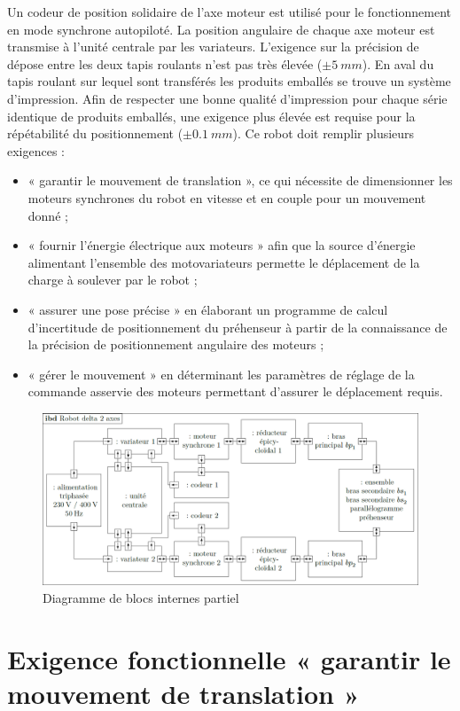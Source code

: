 \documentclass[10pt,fleqn]{article} %
\begin{document}
Un codeur de position solidaire de l’axe moteur est utilisé pour le fonctionnement en mode synchrone autopiloté.
La position angulaire de chaque axe moteur est transmise à l’unité centrale par les variateurs.
L’exigence sur la précision de dépose entre les deux tapis roulants n’est pas très élevée ($\pm\SI{5}{mm}$). En aval du
tapis roulant sur lequel sont transférés les produits emballés se trouve un système d’impression. Afin de respecter
une bonne qualité d’impression pour chaque série identique de produits emballés, une exigence plus élevée est
requise pour la répétabilité du positionnement ($\pm\SI{0,1}{mm}$).
Ce robot doit remplir plusieurs exigences :
\begin{itemize}
\item « garantir le mouvement de translation », ce qui nécessite de dimensionner les moteurs synchrones du robot
en vitesse et en couple pour un mouvement donné ;
\item « fournir l’énergie électrique aux moteurs » afin que la source d’énergie alimentant l’ensemble des motovariateurs
permette le déplacement de la charge à soulever par le robot ;
\item « assurer une pose précise » en élaborant un programme de calcul d’incertitude de positionnement du préhenseur
à partir de la connaissance de la précision de positionnement angulaire des moteurs ;
\item « gérer le mouvement » en déterminant les paramètres de réglage de la commande asservie des moteurs
permettant d’assurer le déplacement requis.
\end{itemize}

\begin{figure}[H]
\centering
\includegraphics[width=\linewidth]{fig_02}
\caption{Diagramme de blocs internes partiel \label{fig_02}}
\end{figure}
\fi

\section{Exigence fonctionnelle « garantir le mouvement de translation »}
\end{document}
